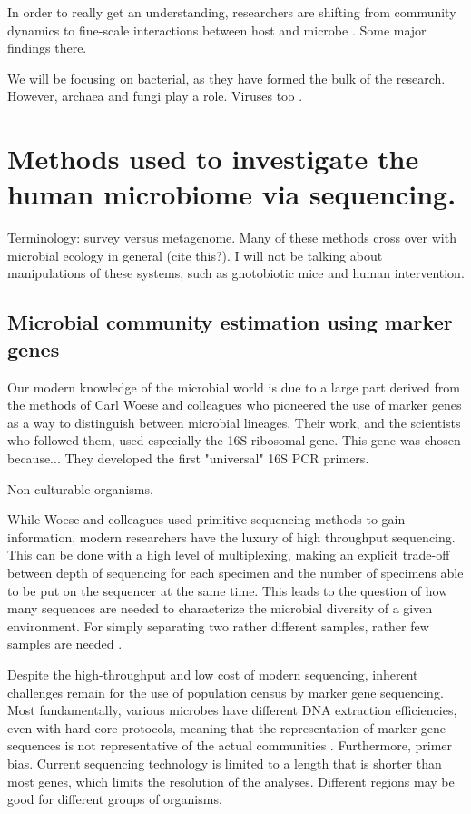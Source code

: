 \documentclass{amsart}
\begin{document}
In order to really get an understanding, researchers are shifting from community dynamics to fine-scale interactions between host and microbe \cite{hooper2012interactions}.
Some major findings there.

We will be focusing on bacterial, as they have formed the bulk of the research.
However, archaea \cite{hoffmann2013archaea} and fungi play a role.
Viruses too \citep{reyes2010viruses,minot2011human,wylie2012sequence,minot2013rapid}.


\section{Methods used to investigate the human microbiome via sequencing.}

Terminology: survey versus metagenome.
Many of these methods cross over with microbial ecology in general \citep{hugenholtz2002review} (cite this?).
I will not be talking about manipulations of these systems, such as gnotobiotic mice and human intervention.


\subsection{Microbial community estimation using marker genes}

Our modern knowledge of the microbial world is due to a large part derived from the methods of Carl Woese and colleagues who pioneered the use of marker genes as a way to distinguish between microbial lineages.
Their work, and the scientists who followed them, used especially the 16S ribosomal gene.
This gene was chosen because...
They developed the first "universal" 16S PCR primers.

Non-culturable organisms.

While Woese and colleagues used primitive sequencing methods to gain information, modern researchers have the luxury of high throughput sequencing.
This can be done with a high level of multiplexing, making an explicit trade-off between depth of sequencing for each specimen and the number of specimens able to be put on the sequencer at the same time.
This leads to the question of how many sequences are needed to characterize the microbial diversity of a given environment.
For simply separating two rather different samples, rather few samples are needed \cite{kuczynski2010microbial}.

Despite the high-throughput and low cost of modern sequencing, inherent challenges remain for the use of population census by marker gene sequencing.
Most fundamentally, various microbes have different DNA extraction efficiencies, even with hard core protocols, meaning that the representation of marker gene sequences is not representative of the actual communities \cite{morgan2010metagenomic}.
Furthermore, primer bias.
Current sequencing technology is limited to a length that is shorter than most genes, which limits the resolution of the analyses.
Different regions may be good for different groups of organisms.
\end{document}
